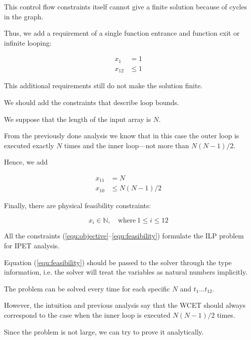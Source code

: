 \documentclass[12pt,a4paper,titlepage,oneside]{article}
\begin{document}
\begin{itemize}
This control flow constraints itself cannot give a finite solution because of cycles in the graph.

Thus, we add a requirement of a single function entrance and function exit or infinite looping:

\begin{equation}
\left.\begin{aligned}
x_1 &= 1\\
x_{12} &\leq 1
\end{aligned}\right.
\label{equ:single}
\end{equation}

This additional requirements still do not make the solution finite.

We should add the constraints that describe loop bounds.

We suppose that the length of the input array is $N$.

From the previously done analysis we know that in this case the outer loop is executed exactly $N$ times and the inner loop---not more than $N(N-1)/2$.

Hence, we add

\begin{equation}
\left.\begin{aligned}
x_{11} &= N\\
x_{10} &\leq N(N-1)/2
\end{aligned}\right.
\label{equ:loops}
\end{equation}

Finally, there are physical feasibility constraints:

\begin{equation}
x_i \in \mathbb{N}, \quad \mathrm{where}\ 1 \leq i \leq 12
\label{equ:feasibility}
\end{equation}

All the constraints (\ref{equ:objective}--\ref{equ:feasibility}) formulate the ILP problem for IPET analysis.

Equation (\ref{equ:feasibility}) should be passed to the solver through the type information, i.e. the solver will treat the variables as natural numbers implicitly.


The problem can be solved every time for each specific $N$ and $t_{1} \ldots t_{12}$.

However, the intuition and previous analysis say that the WCET should always correspond to the case when the inner loop is executed $N(N-1)/2$ times.

Since the problem is not large, we can try to prove it analytically.



\end{itemize}
\end{document}
